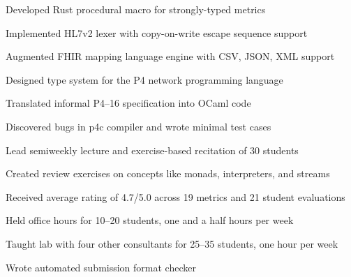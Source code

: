 \documentclass{resume}
\begin{document}
\begin{experience}
    \begin{description}
        \item Developed Rust procedural macro for strongly-typed metrics
        \item Implemented HL7v2 lexer with copy-on-write escape sequence support
        \item Augmented FHIR mapping language engine with CSV, JSON, XML support
    \end{description}

    \begin{description}
        \item Designed type system for the P4 network programming language
        \item Translated informal P4--16 specification into OCaml code
        \item Discovered bugs in p4c compiler and wrote minimal test cases
    \end{description}

    \begin{description}
        \item Lead semiweekly lecture and exercise-based recitation of 30 students
        \item Created review exercises on concepts like monads, interpreters, and streams
        \item Received average rating of 4.7/5.0 across 19 metrics and 21 student evaluations
    \end{description}

    \begin{description}
        \item Held office hours for 10--20 students, one and a half hours per week
        \item Taught lab with four other consultants for 25--35 students, one hour per week
        \item Wrote automated submission format checker
    \end{description}
\end{experience}
\end{document}
